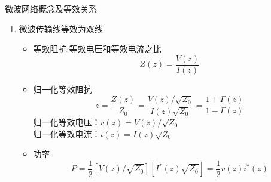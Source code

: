 \begin{frame}{微波网络概念及等效关系}
    \begin{enumerate}
        \item 微波传输线等效为双线
              \begin{itemize}
                  \item 等效阻抗:等效电压和等效电流之比
                        $$Z(z)=\frac{V(z)}{I(z)}$$
                  \item 归一化等效阻抗
                        $$z=\frac{Z(z)}{Z_0}=\frac{V(z)/\sqrt{Z_0}}{I(z)\sqrt{Z_0}}=\frac{1+\Gamma(z)}{1-\Gamma(z)}$$
                        归一化等效电压：$v(z)=V(z)/\sqrt{Z_0}$\\
                        归一化等效电流：$i(z)=I(z)\sqrt{Z_0}$
                  \item 功率\\
                        $$P=\frac{1}{2}[V(z)/\sqrt{Z_0}][I^*(z)\sqrt{Z_0}]=\frac{1}{2}v(z)i^*(z)$$
              \end{itemize}
    \end{enumerate}
\end{frame}

